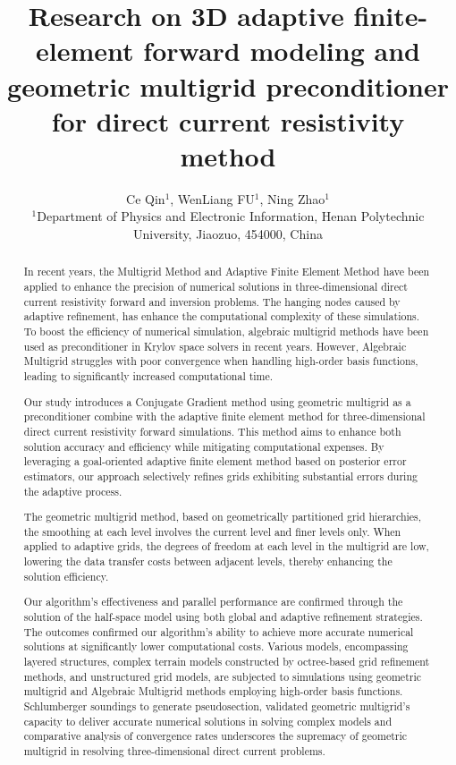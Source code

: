 \documentclass[extra, referee]{gji}
\begin{document}
\title{Research on 3D adaptive finite-element forward modeling and geometric multigrid preconditioner for direct current resistivity method}
\author[Ce Qin]{Ce Qin$^{1}$, WenLiang FU$^{1}$, Ning Zhao$^{1}$ \\
  $^{1}$Department of Physics and Electronic Information,
  Henan Polytechnic University, Jiaozuo, 454000, China
}

\maketitle

\begin{abstract}
In recent years, the Multigrid Method and Adaptive Finite Element Method have
been  applied to enhance the precision of numerical solutions in
three-dimensional direct current resistivity forward and inversion problems. The
hanging nodes caused by adaptive refinement, has enhance the computational
complexity of these simulations. To boost the efficiency of numerical
simulation, algebraic multigrid methods have been used as preconditioner in
Krylov space solvers in recent years. However, Algebraic Multigrid struggles
with poor convergence when handling high-order basis functions, leading to
significantly increased computational time.

Our study introduces a Conjugate Gradient method using geometric multigrid as a
preconditioner combine with the adaptive finite element method for
three-dimensional direct current resistivity forward simulations. This method
aims to enhance both solution accuracy and efficiency while mitigating
computational expenses. By leveraging a goal-oriented adaptive finite element
method based on posterior error estimators, our approach selectively refines
grids exhibiting substantial errors during the adaptive process.

The geometric multigrid method, based on geometrically partitioned grid
hierarchies, the smoothing at each level involves the current level and finer
levels only. When applied to adaptive grids, the degrees of freedom at each
level in the multigrid are low, lowering the data transfer costs between
adjacent levels, thereby enhancing the solution efficiency.

Our algorithm's effectiveness and parallel performance are confirmed through the
solution of the half-space model using both global and adaptive refinement
strategies. The outcomes confirmed our algorithm's ability to achieve more
accurate numerical solutions at significantly lower computational costs. Various
models, encompassing layered structures, complex terrain models constructed by
octree-based grid refinement methods, and unstructured grid models, are
subjected to simulations using geometric multigrid and Algebraic Multigrid
methods employing high-order basis functions. Schlumberger soundings to generate
pseudosection, validated geometric multigrid's capacity to deliver accurate
numerical solutions in solving complex models and comparative analysis of
convergence rates underscores the supremacy of geometric multigrid in resolving
three-dimensional direct current problems.


\end{abstract}
\end{document}
